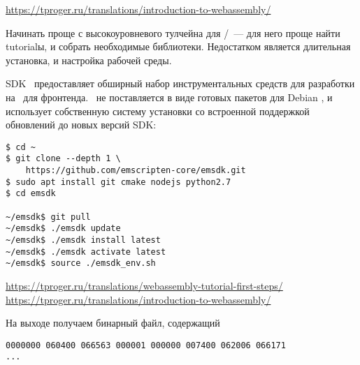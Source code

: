 \secdown

\noindent
\url{https://tproger.ru/translations/introduction-to-webassembly/}

\bigskip
Начинать проще с высокоуровневого тулчейна для \emc/\cpp\ --- для него проще
найти tutorialы, и собрать необходимые библиотеки. Недостатком является
длительная установка, и настройка рабочей среды. 


\noindent
SDK \ems\ предоставляет обширный набор инструментальных средств для разработки
на \cpp\ для фронтенда. \ems\ не поставляется в виде готовых пакетов для Debian
\linux, и использует собственную систему установки со встроенной поддержкой
обновлений до новых версий SDK:
\begin{lstlisting}
$ cd ~
$ git clone --depth 1 \
	https://github.com/emscripten-core/emsdk.git
$ sudo apt install git cmake nodejs python2.7
$ cd emsdk

~/emsdk$ git pull
~/emsdk$ ./emsdk update
~/emsdk$ ./emsdk install latest
~/emsdk$ ./emsdk activate latest
~/emsdk$ source ./emsdk_env.sh
\end{lstlisting}


\noindent
\url{https://tproger.ru/translations/webassembly-tutorial-first-steps/}\\
\url{https://tproger.ru/translations/introduction-to-webassembly/}

\bigskip
{}

\bigskip
{}
На выходе получаем бинарный файл, содержащий 
\begin{lstlisting}[title=none.wasm]
0000000 060400 066563 000001 000000 007400 062006 066171
...
\end{lstlisting}


